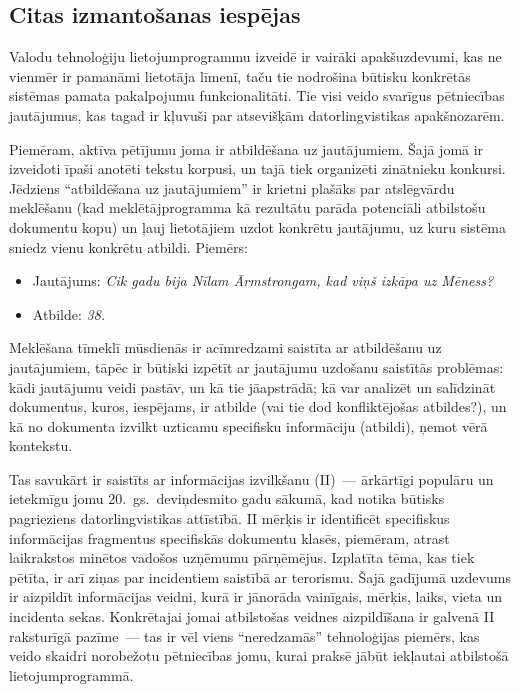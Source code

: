 \begin{multicols}{2}
\subsection{Citas izmantošanas iespējas}

Valodu tehnoloģiju lietojumprogrammu izveidē ir vairāki apakšuzdevumi, kas ne vienmēr ir pamanāmi lietotāja līmenī, taču tie nodrošina būtisku konkrētās sistēmas pamata pakalpojumu funkcionalitāti.
Tie visi veido svarīgus pētniecības jautājumus, kas tagad ir kļuvuši par atsevišķām datorlingvistikas apakš\-nozarēm. 

Piemēram, aktīva pētījumu joma ir atbildēšana uz jautājumiem.
Šajā jomā ir izveidoti īpaši anotēti tekstu korpusi, un tajā tiek organizēti zinātnieku konkursi. 
Jēdziens “atbildēšana uz jautājumiem” ir krietni plašāks par atslēgvārdu meklēšanu (kad meklētājprogramma kā rezultātu parāda potenciāli atbilstošu dokumentu kopu) un ļauj lietotājiem uzdot konkrētu jautājumu, uz kuru sistēma sniedz vienu konkrētu atbildi.
Piemērs:

\begin{itemize}
\item[] Jautājums: \textit{Cik gadu bija Nīlam Ārmstrongam, kad viņš izkāpa uz Mēness?}
\item[] Atbilde: \textit{38.}
\end{itemize}

Meklēšana tīmeklī mūsdienās ir acīmredzami saistīta ar atbildēšanu uz jautājumiem, tāpēc ir būtiski izpētīt ar jautājumu uzdošanu saistītās problēmas: kādi jautājumu veidi pastāv, un kā tie jāapstrādā; kā var analizēt un salīdzināt dokumentus, kuros, iespējams, ir atbilde (vai tie dod konfliktējošas atbildes?), un kā no dokumenta izvilkt uzticamu specifisku informāciju (atbildi), ņemot vērā kontekstu. 


Tas savukārt ir saistīts ar informācijas izvilkšanu (II)~--- ārkārtīgi populāru un ietekmīgu jomu 20.~gs.~deviņdesmito gadu sākumā, kad notika būtisks pagrieziens \mbox{datorlingvistikas} attīstībā.  II mērķis ir identificēt specifiskus informācijas fragmentus specifiskās dokumentu klasēs, piemēram, atrast laikrakstos minētos vadošos uzņēmumu pārņēmējus.  Izplatīta tēma, kas tiek pētīta, ir arī ziņas par incidentiem saistībā ar terorismu.  Šajā gadījumā uzdevums ir aizpildīt informācijas veidni, kurā ir jānorāda vainīgais, mērķis, laiks, vieta un incidenta sekas.  Konkrētajai jomai atbilstošas veidnes aizpildīšana ir galvenā II raksturīgā pazīme~--- tas ir vēl viens “neredzamās” tehnoloģijas piemērs, kas veido skaidri norobežotu pētniecības jomu, kurai praksē jābūt iekļautai atbilstošā lietojumprogrammā.


\end{multicols}

